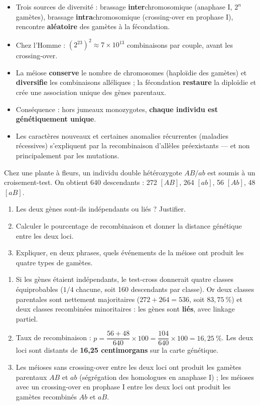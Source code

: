 \documentclass[11pt]{article}
\begin{document}
\begin{aretenir}
\begin{itemize}
\item Trois sources de diversité : brassage \textbf{inter}chromosomique (anaphase I, $2^{n}$ gamètes), brassage \textbf{intra}chromosomique (crossing-over en prophase I), rencontre \textbf{aléatoire} des gamètes à la fécondation.
\item Chez l'Homme : $(2^{23})^{2} \approx 7 \times 10^{13}$ combinaisons par couple, avant les crossing-over.
\item La méiose \textbf{conserve} le nombre de chromosomes (haploïdie des gamètes) et \textbf{diversifie} les combinaisons alléliques ; la fécondation \textbf{restaure} la diploïdie et crée une association unique des gènes parentaux.
\item Conséquence : hors jumeaux monozygotes, \textbf{chaque individu est génétiquement unique}.
\item Les caractères nouveaux et certaines anomalies récurrentes (maladies récessives) s'expliquent par la recombinaison d'allèles préexistants — et non principalement par les mutations.
\end{itemize}
\end{aretenir}

\begin{exercice}
Chez une plante à fleurs, un individu double hétérozygote $AB/ab$ est soumis à un croisement-test. On obtient 640 descendants : 272 $[AB]$, 264 $[ab]$, 56 $[Ab]$, 48 $[aB]$.
\begin{enumerate}
\item Les deux gènes sont-ils indépendants ou liés ? Justifier.
\item Calculer le pourcentage de recombinaison et donner la distance génétique entre les deux loci.
\item Expliquer, en deux phrases, quels événements de la méiose ont produit les quatre types de gamètes.
\end{enumerate}
\end{exercice}

\begin{corrige}[Exercice]
\begin{enumerate}
\item Si les gènes étaient indépendants, le test-cross donnerait quatre classes équiprobables ($1/4$ chacune, soit 160 descendants par classe). Or deux classes parentales sont nettement majoritaires ($272 + 264 = 536$, soit $83,75\ \%$) et deux classes recombinées minoritaires : les gènes sont \textbf{liés}, avec linkage partiel.
\item Taux de recombinaison : $p = \dfrac{56 + 48}{640} \times 100 = \dfrac{104}{640} \times 100 = 16,25\ \%$. Les deux loci sont distants de \textbf{16,25 centimorgans} sur la carte génétique.
\item Les méioses sans crossing-over entre les deux loci ont produit les gamètes parentaux $AB$ et $ab$ (ségrégation des homologues en anaphase I) ; les méioses avec un crossing-over en prophase I entre les deux loci ont produit les gamètes recombinés $Ab$ et $aB$.
\end{enumerate}
\end{corrige}
\end{document}
